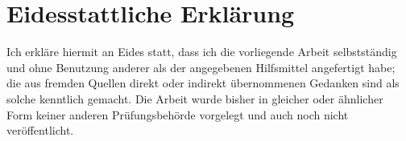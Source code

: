 %
%
\chapter*{Eidesstattliche Erklärung}
\thispagestyle{hsos-only-logo}

Ich erkläre hiermit an Eides statt, dass ich die vorliegende Arbeit selbstständig
und ohne Benutzung anderer als der angegebenen Hilfsmittel angefertigt habe; die
aus fremden Quellen direkt oder indirekt übernommenen Gedanken sind als solche
kenntlich gemacht. Die Arbeit wurde bisher in gleicher oder ähnlicher Form keiner
anderen Prüfungsbehörde vorgelegt und auch noch nicht veröffentlicht.


\hsossignature

